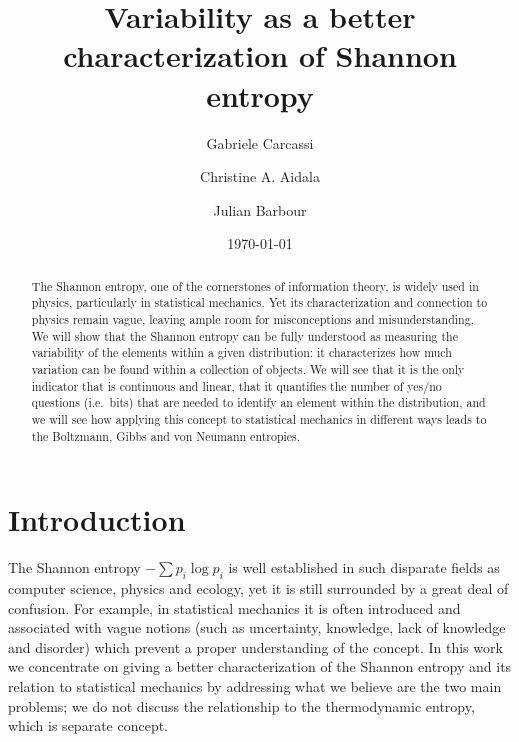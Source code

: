 \documentclass[iopart]{revtex4-1}
\begin{document}
\title{Variability as a better characterization of Shannon entropy}

\author{Gabriele Carcassi}
\author{Christine A. Aidala}

\author{Julian Barbour}

\date{\today}

\begin{abstract}
	The Shannon entropy, one of the cornerstones of information theory, is widely used in physics, particularly in statistical mechanics. Yet its characterization and connection to physics remain vague, leaving ample room for misconceptions and misunderstanding. We will show that the Shannon entropy can be fully understood as measuring the variability of the elements within a given distribution: it characterizes how much variation can be found within a collection of objects. We will see that it is the only indicator that is continuous and linear, that it quantifies the number of yes/no questions (i.e.~bits) that are needed to identify an element within the distribution, and we will see how applying this concept to statistical mechanics in different ways leads to the Boltzmann, Gibbs and von Neumann entropies.
\end{abstract}

\maketitle


\section{Introduction\label{int}}

The Shannon entropy $-\sum p_i \log p_i$ is well established in such disparate fields as computer science, physics\cite{Jaynes1957-1, Grandy} and ecology, yet it is still surrounded by a great deal of confusion.\cite{Swendsen, KishFerry} For example, in statistical mechanics it is often introduced and associated with vague notions (such as uncertainty, knowledge, lack of knowledge and disorder) which prevent a proper understanding of the concept.\cite{Styer, Ben-Naim} In this work we concentrate on giving a better characterization of the Shannon entropy and its relation to statistical mechanics by addressing what we believe are the two main problems; we do not discuss the relationship to the thermodynamic entropy, which is separate concept.
\end{document}
